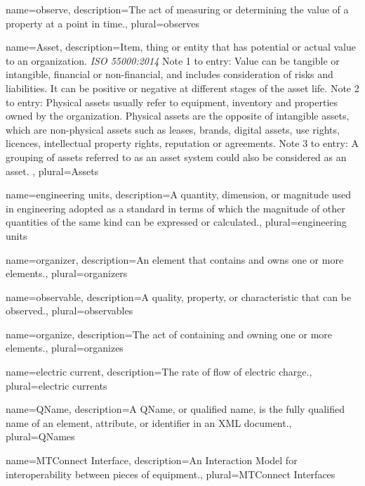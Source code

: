 {
    name={observe},
	description={The act of measuring or determining the value of a property at a point in time.},
	plural={observes}
}

{
    name={Asset},
	description={Item, thing or entity that has potential or actual value to an organization. \textit{ISO 55000:2014}
\newline Note 1 to entry: Value can be tangible or intangible, financial or non-financial, and includes consideration of risks and liabilities. It can be positive or negative at different stages of the asset life.
\newline Note 2 to entry: Physical assets usually refer to equipment, inventory and properties owned by the organization. Physical assets are the opposite of intangible assets, which are non-physical assets such as leases, brands, digital assets, use rights, licences, intellectual property rights, reputation or agreements.
\newline Note 3 to entry: A grouping of assets referred to as an asset system could also be considered as an asset.
},
	plural={Assets}
}

{
    name={engineering units},
	description={A quantity, dimension, or magnitude used in engineering adopted as a standard in terms of which the magnitude of other quantities of the same kind can be expressed or calculated.},
	plural={engineering units}
}

{
    name={organizer},
	description={An element that contains and owns one or more elements.},
	plural={organizers}
}

{
    name={observable},
	description={A quality, property, or characteristic that can be observed.},
	plural={observables}
}

{
    name={organize},
	description={The act of containing and owning one or more elements.},
	plural={organizes}
}

{
    name={electric current},
	description={The rate of flow of electric charge.},
	plural={electric currents}
}

{
    name={QName},
	description={A \gls{QName}, or qualified name, is the fully qualified name of an element, attribute, or identifier in an XML document.},
	plural={QNames}
}

{
    name={MTConnect Interface},
	description={An \gls{Interaction Model} for interoperability between pieces of equipment.},
	plural={MTConnect Interfaces}
}

